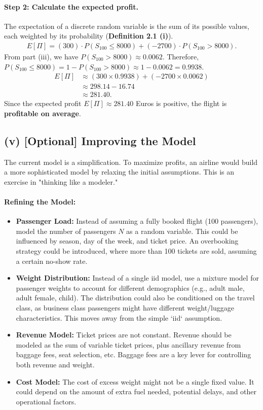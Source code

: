 \documentclass[11pt,a4paper]{article}
\begin{document}
\paragraph{Step 2: Calculate the expected profit.}
The expectation of a discrete random variable is the sum of its possible values, each weighted by its probability (\textbf{Definition 2.1 (i)}).
\begin{align*}
    E[\Pi] = (300) \cdot P(S_{100} \le 8000) + (-2700) \cdot P(S_{100} > 8000).
\end{align*}
From part (iii), we have $P(S_{100} > 8000) \approx 0.0062$. Therefore, $P(S_{100} \le 8000) = 1 - P(S_{100} > 8000) \approx 1 - 0.0062 = 0.9938$.
\begin{align*}
    E[\Pi] &\approx (300 \times 0.9938) + (-2700 \times 0.0062) \\
    &\approx 298.14 - 16.74 \\
    &\approx 281.40.
\end{align*}
Since the expected profit $E[\Pi] \approx 281.40$ Euros is positive, the flight is \textbf{profitable on average}.

\subsection*{(v) [Optional] Improving the Model}
The current model is a simplification. To maximize profits, an airline would build a more sophisticated model by relaxing the initial assumptions. This is an exercise in "thinking like a modeler."

\paragraph{Refining the Model:}
\begin{itemize}
    \item \textbf{Passenger Load:} Instead of assuming a fully booked flight (100 passengers), model the number of passengers $N$ as a random variable. This could be influenced by season, day of the week, and ticket price. An overbooking strategy could be introduced, where more than 100 tickets are sold, assuming a certain no-show rate.
    \item \textbf{Weight Distribution:} Instead of a single iid model, use a mixture model for passenger weights to account for different demographics (e.g., adult male, adult female, child). The distribution could also be conditioned on the travel class, as business class passengers might have different weight/luggage characteristics. This moves away from the simple `iid` assumption.
    \item \textbf{Revenue Model:} Ticket prices are not constant. Revenue should be modeled as the sum of variable ticket prices, plus ancillary revenue from baggage fees, seat selection, etc. Baggage fees are a key lever for controlling both revenue and weight.
    \item \textbf{Cost Model:} The cost of excess weight might not be a single fixed value. It could depend on the amount of extra fuel needed, potential delays, and other operational factors.
\end{itemize}
\end{document}
